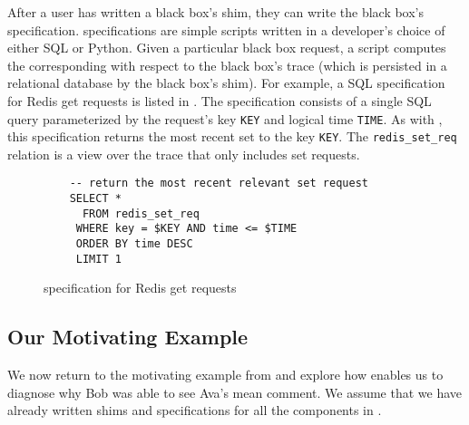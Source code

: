 After a user has written a black box's shim, they can write the black box's
\watprovenance{} specification. \fluent{} \watprovenance{} specifications are
simple scripts written in a developer's choice of either SQL or Python. Given a particular black box
request, a \watprovenance{}  script computes the corresponding \watprovenance{}
with respect to the black box's trace (which is persisted in a relational
database by the black box's shim). For example, a SQL \watprovenance{}
specification for Redis get requests is listed in
. The \watprovenance{} specification consists of
a single SQL query parameterized by the request's key \texttt{KEY} and logical
time \texttt{TIME}. As with , this \watprovenance{}
specification returns the most recent set to the key \texttt{KEY}. The
\texttt{redis\_set\_req} relation is a view over the trace that only includes
set requests.

\begin{figure}[ht]
  \begin{Verbatim}
    -- return the most recent relevant set request
    SELECT *
      FROM redis_set_req
     WHERE key = $KEY AND time <= $TIME
     ORDER BY time DESC
     LIMIT 1
  \end{Verbatim}
  \caption{\Watprovenance{} specification for Redis get requests}
\end{figure}

\subsection{Our Motivating Example}
\newcommand{\systemname}{ZardozBook}
We now return to the motivating example from  and
explore how \fluent{} enables us to diagnose why Bob was able to see Ava's mean
comment. We assume that we have already written \fluent{} shims and
\watprovenance{} specifications for all the components in .

